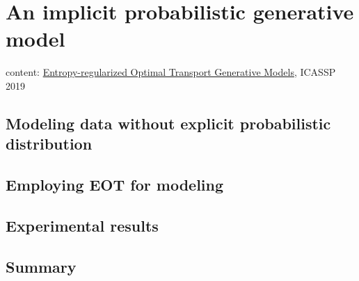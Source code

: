 \chapter{An implicit probabilistic generative model}
content: \href{https://ieeexplore.ieee.org/stamp/stamp.jsp?arnumber=8682721}{Entropy-regularized Optimal Transport Generative Models}, ICASSP 2019


\section{Modeling data without explicit probabilistic distribution}

\section{Employing EOT for modeling}

\section{Experimental results}

\section{Summary}


